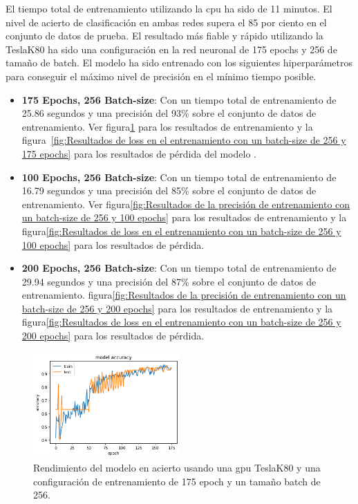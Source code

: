 El tiempo total de entrenamiento utilizando la cpu ha sido de 11 minutos.
El nivel de acierto de clasificación en ambas redes supera el 85 por ciento en el conjunto de datos de prueba.
El resultado más fiable y rápido utilizando la TeslaK80 ha sido una configuración en la red neuronal de 175 epochs y 256 de tamaño de batch.
El modelo ha sido entrenado con los siguientes hiperparámetros para conseguir el máximo nivel de precisión en el mínimo tiempo posible.
\begin{itemize}
    \item \textbf{175 Epochs, 256 Batch-size}: Con un tiempo total de entrenamiento de 25.86 segundos y una precisión del 93\% sobre el conjunto de datos de entrenamiento.
    Ver figura\ref{fig:Resultados de la precisión de entrenamiento con un batch-size de 256 y 175 epochs} para los resultados de entrenamiento y la figura~\ref{fig:Resultados de loss en el entrenamiento con un batch-size de 256 y 175 epochs} para los resultados de pérdida del modelo .
    \item \textbf{100 Epochs, 256 Batch-size}: Con un tiempo total de entrenamiento de 16.79 segundos y una precisión del 85\% sobre el conjunto de datos de entrenamiento.
    Ver figura\ref{fig:Resultados de la precisión de entrenamiento con un batch-size de 256 y 100 epochs} para los resultados de entrenamiento y la figura\ref{fig:Resultados de loss en el entrenamiento con un batch-size de 256 y 100 epochs} para los resultados de pérdida.
    \item \textbf{200 Epochs, 256 Batch-size}: Con un tiempo total de entrenamiento de 29.94 segundos y una precisión del 87\% sobre el conjunto de datos de entrenamiento.
    \Ver figura\ref{fig:Resultados de la precisión de entrenamiento con un batch-size de 256 y 200 epochs} para los resultados de entrenamiento y la figura\ref{fig:Resultados de loss en el entrenamiento con un batch-size de 256 y 200 epochs} para los resultados de pérdida.
\end{itemize}

\begin{figure}
    \centering
    \includegraphics[width=0.5\textwidth]{images/chapter5/batch_256_175_epoch.png}
    \caption{Rendimiento del modelo en acierto usando una gpu TeslaK80 y una configuración de entrenamiento de 175 epoch y un tamaño batch de 256.}
    \label{fig:Resultados de la precisión de entrenamiento con un batch-size de 256 y 175 epochs}
\end{figure}

